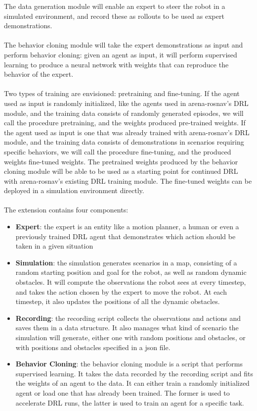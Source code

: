 The data generation module will enable an expert to steer the robot in a simulated environment, and record these as rollouts to be used as expert demonstrations.
\\\\\noindent 
The behavior cloning module will take the expert demonstrations as input and perform behavior cloning: given an agent as input, it will perform supervised learning to produce a neural network with weights that can reproduce the behavior of the expert.
\\\\\noindent 
Two types of training are envisioned: pretraining and fine-tuning. If the agent used as input is randomly initialized, like the agents used in arena-rosnav’s DRL module, and the training data consists of randomly generated episodes, we will call the procedure pretraining, and the weights produced pre-trained weights. If the agent used as input is one that was already trained with arena-rosnav’s DRL module, and the training data consists of demonstrations in scenarios requiring specific behaviors, we will call the procedure fine-tuning, and the produced weights fine-tuned weights. The pretrained weights produced by the behavior cloning module will be able to be used as a starting point for continued DRL with arena-rosnav’s existing DRL training module. The fine-tuned weights can be deployed in a simulation environment directly.
\\\\\noindent 
The extension contains four components:
\begin{itemize}
    \item \textbf{Expert}: the expert is an entity like a motion planner, a human or even a previously trained DRL agent that demonstrates which action should be taken in a given situation
    \item \textbf{Simulation}: the simulation generates scenarios in a map, consisting of a random starting position and goal for the robot, as well as random dynamic obstacles. It will compute the observations the robot sees at every timestep, and takes the action chosen by the expert to move the robot. At each timestep, it also updates the positions of all the dynamic obstacles.
    \item \textbf{Recording}: the recording script collects the observations and actions and saves them in a data structure. It also manages what kind of scenario the simulation will generate, either one with random positions and obstacles, or with positions and obstacles specified in a json file.
    \item \textbf{Behavior Cloning}: the behavior cloning module is a script that performs supervised learning. It takes the data recorded by the recording script and fits the weights of an agent to the data. It can either train a randomly initialized agent or load one that has already been trained. The former is used to accelerate DRL runs, the latter is used to train an agent for a specific task.
\end{itemize}